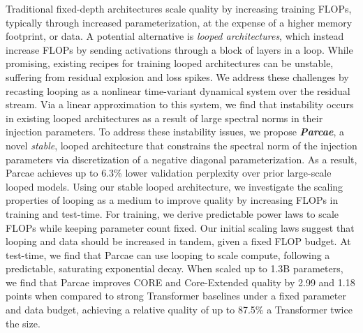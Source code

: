 \noindent Traditional fixed-depth architectures scale quality by increasing training FLOPs, typically through increased parameterization, at the expense of a higher memory footprint, or data. 
A potential alternative is \emph{looped architectures}, which instead increase FLOPs by sending activations through a block of layers in a loop.
While promising, existing recipes for training looped architectures can be unstable, suffering from residual explosion and loss spikes.
We address these challenges by recasting looping as a nonlinear time-variant dynamical system over the residual stream. Via a linear approximation to this system, we find that instability occurs in existing looped architectures as a result of large spectral norms in their injection parameters.
To address these instability issues, we propose \emph{\textbf{Parcae}}, a novel \emph{stable}, looped architecture that constrains the spectral norm of the injection parameters via discretization of a negative diagonal parameterization. As a result, Parcae achieves up to 6.3\% lower validation perplexity over prior large-scale looped models.
Using our stable looped architecture, we investigate the scaling properties of looping as a medium to improve quality by increasing FLOPs in training and test-time.
For training, we derive predictable power laws to scale FLOPs while keeping parameter count fixed. Our initial scaling laws suggest that looping and data should be increased in tandem, given a fixed FLOP budget.
At test-time, we find that Parcae can use looping to scale compute, following a predictable, saturating exponential decay. 
When scaled up to 1.3B parameters, we find that Parcae improves CORE and Core-Extended quality by 2.99 and 1.18 points when compared to strong Transformer baselines under a fixed parameter and data budget, achieving a relative quality of up to 87.5\% a Transformer twice the size.